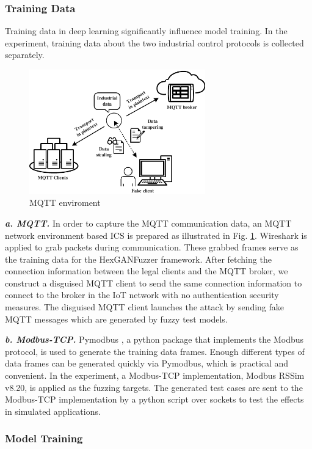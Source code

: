 \subsubsection{Training Data}
Training data in deep learning significantly influence model training. In the experiment, training data about the two industrial control protocols is collected separately. 

\begin{figure}[htbp]   %
	\centering 
	\includegraphics[width=3in]{FigMQTTEnvironment.pdf}
	\caption{MQTT enviroment}
	\label{FigMQTTEnvironment}
\end{figure}

\quad \textit{\textbf{a. MQTT.}}
In order to capture the MQTT communication data, an MQTT network environment based ICS is prepared as illustrated in Fig. \ref{FigMQTTEnvironment}. Wireshark \cite{orebaugh2006wireshark} is applied to grab packets during communication. These grabbed frames serve as the training data for the HexGANFuzzer framework. 
After fetching the connection information between the legal clients and the MQTT broker, we construct a disguised MQTT client to send the same connection information to connect to the broker in the IoT network with no authentication security measures. The disguised MQTT client launches the attack by sending fake MQTT messages which are generated by fuzzy test models. 

\quad \textit{\textbf{b. Modbus-TCP.}}
Pymodbus \cite{collins2013pymodbus}, a python package that implements the Modbus protocol, is used to generate the training data frames. Enough different types of data frames can be generated quickly via Pymodbus, which is practical and convenient. In the experiment, a Modbus-TCP implementation, Modbus RSSim v8.20, is applied as the fuzzing targets. The generated test cases are sent to the Modbus-TCP implementation by a python script over sockets to test the effects in simulated applications.


\subsubsection{Model Training}

